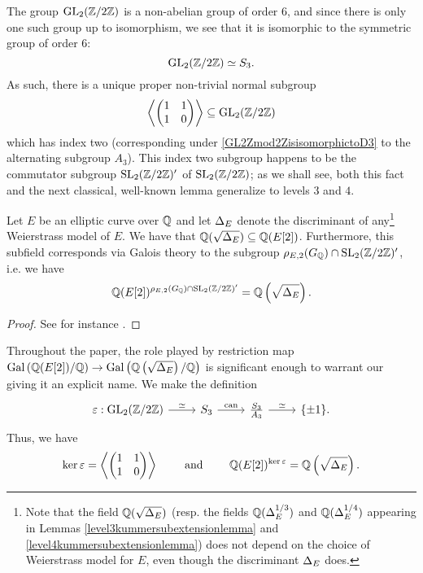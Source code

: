 The group $\operatorname{GL}_2(\mathbb{Z}/2\mathbb{Z})$ is a non-abelian group of order $6$, and since there is only one such group up to isomorphism, we see that it is isomorphic to the symmetric group of order $6$:  
\begin{equation} \label{GL2Zmod2ZisisomorphictoD3}
\operatorname{GL}_2(\mathbb{Z}/2\mathbb{Z}) \simeq S_3.
\end{equation}
As such, there is a unique proper non-trivial normal subgroup 
\[
\left\langle \begin{pmatrix} 1 & 1 \\ 1 & 0 \end{pmatrix} \right\rangle \subseteq \operatorname{GL}_2(\mathbb{Z}/2\mathbb{Z})
\]
which has index two (corresponding under \eqref{GL2Zmod2ZisisomorphictoD3} to the alternating subgroup $A_3$).  This index two subgroup happens to be the commutator subgroup $\operatorname{SL}_2(\mathbb{Z}/2\mathbb{Z})'$ of $\operatorname{SL}_2(\mathbb{Z}/2\mathbb{Z})$; as we shall see, both this fact and the next classical, well-known lemma generalize to levels $3$ and $4$.
\begin{lemma} \label{level2kummersubextensionlemma}
Let $E$ be an elliptic curve over $\mathbb{Q}$ and let $\Delta_E$ denote the discriminant of any\footnote{Note that the field $\mathbb{Q}(\sqrt{\Delta_E})$ (resp. the fields $\mathbb{Q}(\Delta_E^{1/3})$ and $\mathbb{Q}(\Delta_E^{1/4})$ appearing in Lemmas \ref{level3kummersubextensionlemma} and \ref{level4kummersubextensionlemma}) does not depend on the choice of Weierstrass model for $E$, even though the discriminant $\Delta_E$ does.} Weierstrass model of $E$.  We have that $\mathbb{Q}(\sqrt{\Delta_E}) \subseteq \mathbb{Q}(E[2])$.  Furthermore, this subfield corresponds via Galois theory to the subgroup $\rho_{E,2}(G_{\mathbb{Q}}) \cap \operatorname{SL}_2(\mathbb{Z}/2\mathbb{Z})'$, i.e. we have
\[
\mathbb{Q}(E[2])^{\rho_{E,2}(G_{\mathbb{Q}}) \cap \operatorname{SL}_2(\mathbb{Z}/2\mathbb{Z})'} = \mathbb{Q}\left( \sqrt{\Delta_E} \right).
\]
\end{lemma}
\begin{proof}
See for instance \cite[pp. 218]{langtrotter}.
\end{proof}
Throughout the paper, the role played by restriction map $\operatorname{Gal}\left( \mathbb{Q}(E[2])/\mathbb{Q} \right) \rightarrow \operatorname{Gal}\left( \mathbb{Q}\left( \sqrt{\Delta_E} \right)/\mathbb{Q} \right)$ is significant enough to warrant our giving it an explicit name.  We make the definition
\begin{equation} \label{defofve}
\begin{tikzcd}
\ve : \GL_2(\mbz/2\mbz) \rar{\simeq}& S_3 \rar{\can}& \frac{S_3}{A_3} \rar{\simeq}& \{ \pm 1 \}.
\end{tikzcd}
\end{equation} 
Thus, we have
\[
\ker \varepsilon = \left\langle \begin{pmatrix} 1 & 1 \\ 1 & 0 \end{pmatrix} \right\rangle \quad\quad \text{ and } \quad\quad \mathbb{Q}(E[2])^{\ker \varepsilon} = \mathbb{Q}\left( \sqrt{\Delta_E} \right).
\]


